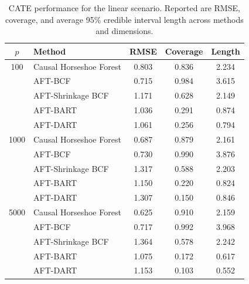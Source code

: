 


\begin{table}[H]
\centering
\small
\renewcommand{\arraystretch}{0.9}
\begin{tabular}{clccc}
\toprule
$p$ & Method & RMSE & Coverage & Length \\
\midrule
100 & Causal Horseshoe Forest & 0.803 & 0.836 & 2.234 \\
  & AFT-BCF & 0.715 & 0.984 & 3.615 \\
  & AFT-Shrinkage BCF & 1.171 & 0.628 & 2.149 \\
  & AFT-BART & 1.036 & 0.291 & 0.874 \\
  & AFT-DART & 1.061 & 0.256 & 0.794 \\
\midrule
1000 & Causal Horseshoe Forest & 0.687 & 0.879 & 2.161 \\
  & AFT-BCF & 0.730 & 0.990 & 3.876 \\
  & AFT-Shrinkage BCF & 1.317 & 0.588 & 2.203 \\
  & AFT-BART & 1.150 & 0.220 & 0.824 \\
  & AFT-DART & 1.307 & 0.150 & 0.846 \\
\midrule
5000 & Causal Horseshoe Forest & 0.625 & 0.910 & 2.159 \\
  & AFT-BCF & 0.717 & 0.992 & 3.968 \\
  & AFT-Shrinkage BCF & 1.364 & 0.578 & 2.242 \\
  & AFT-BART & 1.075 & 0.172 & 0.617 \\
  & AFT-DART & 1.153 & 0.103 & 0.552 \\
\bottomrule
\end{tabular}
\caption{CATE performance for the linear scenario. Reported are RMSE, coverage, and average 95\% credible interval length across methods and dimensions.}
\label{tab:main_linear}
\end{table}

